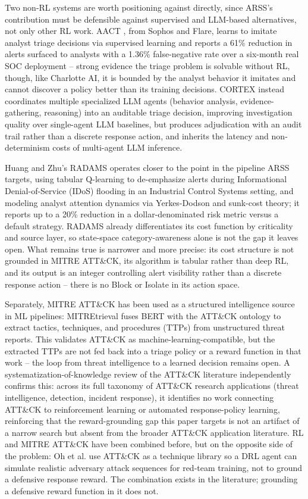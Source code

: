 \documentclass[conference]{IEEEtran}
\begin{document}
Two non-RL systems are worth positioning against directly, since ARSS's contribution must be defensible against supervised and LLM-based alternatives, not only other RL work. AACT \cite{aact2025}, from Sophos and Flare, learns to imitate analyst triage decisions via supervised learning and reports a 61\% reduction in alerts surfaced to analysts with a 1.36\% false-negative rate over a six-month real SOC deployment -- strong evidence the triage problem is solvable without RL, though, like Charlotte AI, it is bounded by the analyst behavior it imitates and cannot discover a policy better than its training decisions. CORTEX \cite{cortex2025} instead coordinates multiple specialized LLM agents (behavior analysis, evidence-gathering, reasoning) into an auditable triage decision, improving investigation quality over single-agent LLM baselines, but produces adjudication with an audit trail rather than a discrete response action, and inherits the latency and non-determinism costs of multi-agent LLM inference.

Huang and Zhu's RADAMS \cite{radams2022} operates closer to the point in the pipeline ARSS targets, using tabular Q-learning to de-emphasize alerts during Informational Denial-of-Service (IDoS) flooding in an Industrial Control Systems setting, and modeling analyst attention dynamics via Yerkes-Dodson and sunk-cost theory; it reports up to a 20\% reduction in a dollar-denominated risk metric versus a default strategy. RADAMS already differentiates its cost function by criticality and source layer, so state-space category-awareness alone is not the gap it leaves open. What remains true is narrower and more precise: its cost structure is not grounded in MITRE ATT\&CK, its algorithm is tabular rather than deep RL, and its output is an integer controlling alert visibility rather than a discrete response action -- there is no Block or Isolate in its action space.

Separately, MITRE ATT\&CK has been used as a structured intelligence source in ML pipelines: MITREtrieval \cite{mitretrieval2024} fuses BERT with the ATT\&CK ontology to extract tactics, techniques, and procedures (TTPs) from unstructured threat reports. This validates ATT\&CK as machine-learning-compatible, but the extracted TTPs are not fed back into a triage policy or a reward function in that work -- the loop from threat intelligence to a learned decision remains open. A systematization-of-knowledge review of the ATT\&CK literature \cite{sok_attack2023} independently confirms this: across its full taxonomy of ATT\&CK research applications (threat intelligence, detection, incident response), it identifies no work connecting ATT\&CK to reinforcement learning or automated response-policy learning, reinforcing that the reward-grounding gap this paper targets is not an artifact of a narrow search but absent from the broader ATT\&CK application literature. RL and MITRE ATT\&CK have been combined before, but on the opposite side of the problem: Oh et al. \cite{oh2024attacksim} use ATT\&CK as a technique library so a DRL agent can simulate realistic adversary attack sequences for red-team training, not to ground a defensive response reward. The combination exists in the literature; grounding a defensive reward function in it does not.
\end{document}
